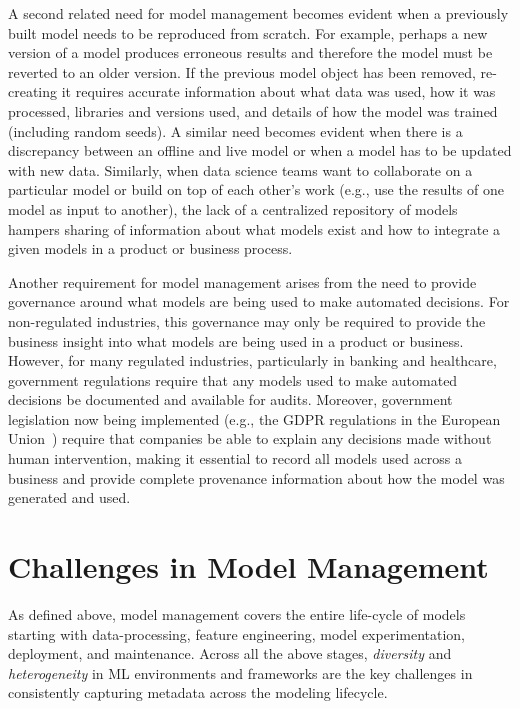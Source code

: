 \documentclass[11pt]{article}
\begin{document}
A second related need for model management becomes evident when a previously built model needs to be reproduced from scratch.
For example, perhaps a new version of a model produces erroneous results and therefore the model must be reverted to an older version.
If the previous model object has been removed, re-creating it requires accurate information about what data was used, how it was processed, libraries and versions used, and details of how the model was trained (including random seeds).
A similar need becomes evident when there is a discrepancy between an offline and live model or when a model has to be updated with new data.
Similarly, when data science teams want to collaborate on a particular model or build on top of each other's work (e.g., use the results of one model as input to another), the lack of a centralized repository of models hampers sharing of information about what models exist and how to integrate a given models in a product or business process.
    
Another requirement for model management arises from the need to provide governance around what models are being used to make automated decisions. 
For non-regulated industries, this governance may only be required to provide the business insight into what models are being used in a product or business.
However, for many regulated industries, particularly in banking and healthcare, government regulations require that any models used to make automated decisions be documented and available for audits. 
Moreover, government legislation now being implemented (e.g., the GDPR regulations in the European Union~\cite{gdpr}) require that companies be able to explain any decisions made without human intervention, 
making it essential to record all models used across a business and provide complete provenance information about how the model was generated and used.


\section{Challenges in Model Management}
\label{sec:challenges}

As defined above, model management covers the entire life-cycle of models starting with data-processing, feature engineering, model experimentation, deployment, and maintenance.
Across all the above stages, {\it diversity} and {\it heterogeneity} in ML environments and frameworks are the key challenges in consistently capturing metadata across the modeling lifecycle.
\end{document}

